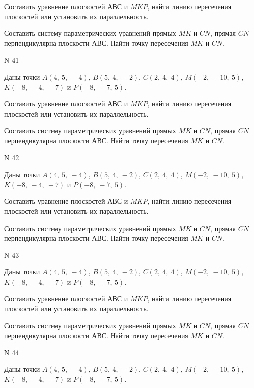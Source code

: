 \documentclass[11pt]{report}
\begin{document}
Составить уравнение плоскостей $АВС$ и $MKP$,
найти линию пересечения плоскостей или установить их параллельность.

Составить систему параметрических уравнений прямых $MK$ и $CN$,
прямая $CN$ перпендикулярна плоскости $АВС$. 
Найти точку пересечения $MK$ и $CN$.



 N 41

Даны точки $A\left( 4, \  5, \  -4\right)$, $B\left( 5, \  4, \  -2\right)$, $C\left( 2, \  4, \  4\right)$, $M\left( -2, \  -10, \  5\right)$, $K\left( -8, \  -4, \  -7\right)$ и $P\left( -8, \  -7, \  5\right)$.


Составить уравнение плоскостей $АВС$ и $MKP$,
найти линию пересечения плоскостей или установить их параллельность.

Составить систему параметрических уравнений прямых $MK$ и $CN$,
прямая $CN$ перпендикулярна плоскости $АВС$. 
Найти точку пересечения $MK$ и $CN$.



 N 42

Даны точки $A\left( 4, \  5, \  -4\right)$, $B\left( 5, \  4, \  -2\right)$, $C\left( 2, \  4, \  4\right)$, $M\left( -2, \  -10, \  5\right)$, $K\left( -8, \  -4, \  -7\right)$ и $P\left( -8, \  -7, \  5\right)$.


Составить уравнение плоскостей $АВС$ и $MKP$,
найти линию пересечения плоскостей или установить их параллельность.

Составить систему параметрических уравнений прямых $MK$ и $CN$,
прямая $CN$ перпендикулярна плоскости $АВС$. 
Найти точку пересечения $MK$ и $CN$.



 N 43

Даны точки $A\left( 4, \  5, \  -4\right)$, $B\left( 5, \  4, \  -2\right)$, $C\left( 2, \  4, \  4\right)$, $M\left( -2, \  -10, \  5\right)$, $K\left( -8, \  -4, \  -7\right)$ и $P\left( -8, \  -7, \  5\right)$.


Составить уравнение плоскостей $АВС$ и $MKP$,
найти линию пересечения плоскостей или установить их параллельность.

Составить систему параметрических уравнений прямых $MK$ и $CN$,
прямая $CN$ перпендикулярна плоскости $АВС$. 
Найти точку пересечения $MK$ и $CN$.



 N 44

Даны точки $A\left( 4, \  5, \  -4\right)$, $B\left( 5, \  4, \  -2\right)$, $C\left( 2, \  4, \  4\right)$, $M\left( -2, \  -10, \  5\right)$, $K\left( -8, \  -4, \  -7\right)$ и $P\left( -8, \  -7, \  5\right)$.
\end{document}
